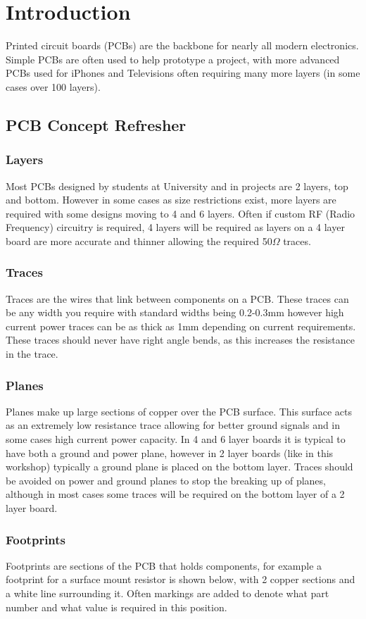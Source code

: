 \section{Introduction}
Printed circuit boards (PCBs) are the backbone for nearly all modern electronics. Simple PCBs are often used to help prototype a project, with more advanced PCBs used for iPhones and Televisions often requiring many more layers (in some cases over 100 layers).

\subsection{PCB Concept Refresher}
\subsubsection{Layers}
Most PCBs designed by students at University and in projects are 2 layers, top and bottom. However in some cases as size restrictions exist, more layers are required with some designs moving to 4 and 6 layers. Often if custom RF (Radio Frequency) circuitry is required, 4 layers will be required as layers on a 4 layer board are more accurate and thinner allowing the required 50$\Omega$ traces.
\subsubsection{Traces}
Traces are the wires that link between components on a PCB. These traces can be any width you require with standard widths being 0.2-0.3mm however high current power traces can be as thick as 1mm depending on current requirements. These traces should never have right angle bends, as this increases the resistance in the trace.
\subsubsection{Planes}
Planes make up large sections of copper over the PCB surface. This surface acts as an extremely low resistance trace allowing for better ground signals and in some cases high current power capacity. In 4 and 6 layer boards it is typical to have both a ground and power plane, however in 2 layer boards (like in this workshop) typically a ground plane is placed on the bottom layer. Traces should be avoided on power and ground planes to stop the breaking up of planes, although in most cases some traces will be required on the bottom layer of a 2 layer board.
\subsubsection{Footprints}
Footprints are sections of the PCB that holds components, for example a footprint for a surface mount resistor is shown below, with 2 copper sections and a white line surrounding it. Often markings are added to denote what part number and what value is required in this position.
\newpage